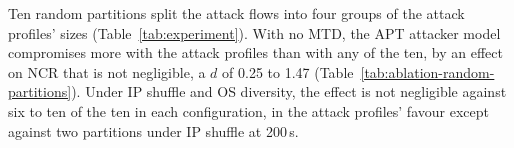 \documentclass{cshonours}
\begin{document}
Ten random partitions split the attack flows into four groups of the attack
profiles' sizes (Table~\ref{tab:experiment}). With no MTD, the APT attacker
model compromises more with the attack profiles than with any of the ten, by
an effect on NCR that is not negligible, a $d$ of 0.25 to 1.47
(Table~\ref{tab:ablation-random-partitions}).
Under IP shuffle and OS
diversity, the effect is not negligible against six to ten of the ten in each
configuration, in the attack profiles' favour except against two partitions
under IP shuffle at 200\,s.
\end{document}
